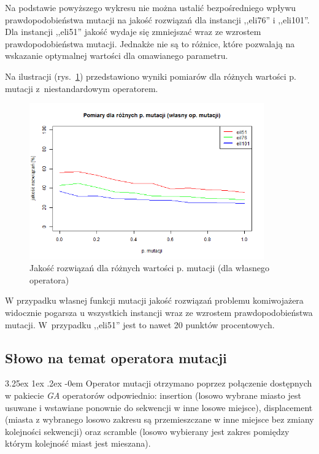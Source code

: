 \documentclass[11pt, a4paper]{article}
\makeatletter
\newcommand{\fbi}{\leavevmode{\parindent=1em\indent}}
\renewcommand\paragraph{\@startsection{paragraph}{5}{\z@}
  {3.25ex \@plus1ex \@minus.2ex}
  {-0em}
  {\normalfont\normalsize\bfseries}}
\makeatother
\begin{document}
\fbi
Na podstawie powyższego wykresu nie można ustalić bezpośredniego wpływu prawdopodobieństwa mutacji na jakość rozwiązań dla instancji ,,eli76'' i ,,eli101''. Dla instancji ,,eli51'' jakość wydaje się zmniejszać wraz ze wzrostem prawdopodobieństwa mutacji. Jednakże nie są to różnice, które pozwalają na wskazanie optymalnej wartości dla omawianego parametru.

\fbi
Na ilustracji (rys.~\ref{fig:tspmutcust}) przedstawiono wyniki pomiarów dla różnych wartości p. mutacji z~niestandardowym operatorem.

\begin{figure}[H]
	\centering
	\includegraphics[width=0.9\textwidth]{./assets/tsp_mut_custom.png}
	\caption{Jakość rozwiązań dla różnych wartości p. mutacji (dla własnego operatora)}
	\label{fig:tspmutcust}
\end{figure}

\fbi
W przypadku własnej funkcji mutacji jakość rozwiązań problemu komiwojażera widocznie pogarsza u wszystkich instancji wraz ze wzrostem prawdopodobieństwa mutacji. W~przypadku ,,eli51'' jest to nawet 20 punktów procentowych.

\subsection{Słowo na temat operatora mutacji}
\paragraph{}
Operator mutacji otrzymano poprzez połączenie dostępnych w pakiecie \textit{GA} operatorów odpowiednio: insertion (losowo wybrane miasto jest usuwane i wstawiane ponownie do sekwencji w inne losowe miejsce), displacement (miasta z wybranego losowo zakresu są przemieszczane w inne miejsce bez zmiany kolejności sekwencji) oraz scramble (losowo wybierany jest zakres pomiędzy którym kolejność miast jest mieszana).
\end{document}
